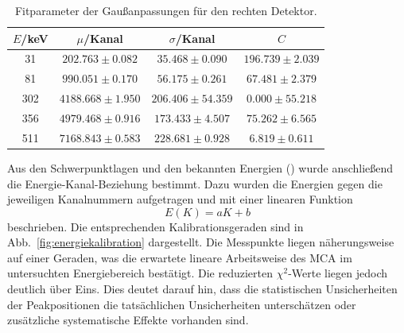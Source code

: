 \begin{table}[htbp] 
    \centering \caption{Fitparameter der Gaußanpassungen für den rechten Detektor.} 
    \label{tab:fit_rechts} 
    \begin{tabular}{c c c c} 
        \hline 
        $E$/keV & $\mu$/Kanal & $\sigma$/Kanal & $C$ \\ 
        \hline 
        31 & $202.763 \pm 0.082$ & $35.468 \pm 0.090$ & $196.739 \pm 2.039$ \\ 
        81 & $990.051 \pm 0.170$ & $56.175 \pm 0.261$ & $67.481 \pm 2.379$ \\ 
        302 & $4188.668 \pm 1.950$ & $206.406 \pm 54.359$ & $0.000 \pm 55.218$ \\ 
        356 & $4979.468 \pm 0.916$ & $173.433 \pm 4.507$ & $75.262 \pm 6.565$ \\ 
        511 & $7168.843 \pm 0.583$ & $228.681 \pm 0.928$ & $6.819 \pm 0.611$ \\ 
        \hline 
    \end{tabular} 
\end{table} 

Aus den Schwerpunktlagen und den bekannten Energien (\cite{praktikum}) wurde anschließend die Energie-Kanal-Beziehung bestimmt. 
Dazu wurden die Energien gegen die jeweiligen Kanalnummern aufgetragen und mit einer linearen Funktion 
\[ E(K)=aK+b \] beschrieben. 
Die entsprechenden Kalibrationsgeraden sind in Abb.~\ref{fig:energiekalibration} dargestellt. 
Die Messpunkte liegen näherungsweise auf einer Geraden, was die erwartete lineare Arbeitsweise des MCA im untersuchten Energiebereich bestätigt. 
Die reduzierten $\chi^2$-Werte liegen jedoch deutlich über Eins. 
Dies deutet darauf hin, dass die statistischen Unsicherheiten der Peakpositionen die tatsächlichen Unsicherheiten unterschätzen oder zusätzliche systematische Effekte vorhanden sind. 

